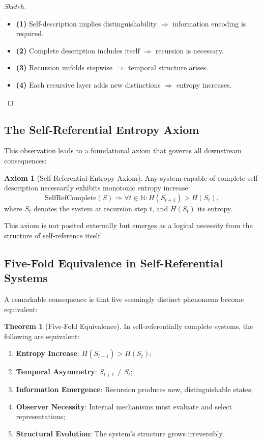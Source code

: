 \documentclass[11pt]{article}
\theoremstyle{remark}
\theoremstyle{definition}
\newtheorem{theorem}{Theorem}
\newtheorem{axiom}{Axiom}
\begin{document}
\begin{proof}[Sketch]
\begin{itemize}
\item \textbf{(1)} Self-description implies distinguishability $\Rightarrow$ information encoding is required.
\item \textbf{(2)} Complete description includes itself $\Rightarrow$ recursion is necessary.
\item \textbf{(3)} Recursion unfolds stepwise $\Rightarrow$ temporal structure arises.
\item \textbf{(4)} Each recursive layer adds new distinctions $\Rightarrow$ entropy increases.
\end{itemize}
\end{proof}

\subsection{The Self-Referential Entropy Axiom}

This observation leads to a foundational axiom that governs all downstream consequences:

\begin{axiom}[Self-Referential Entropy Axiom]
Any system capable of complete self-description necessarily exhibits monotonic entropy increase:
\[
\text{SelfRefComplete}(S) \Rightarrow \forall t \in \mathbb{N}: H(S_{t+1}) > H(S_t),
\]
where $S_t$ denotes the system at recursion step $t$, and $H(S_t)$ its entropy.
\end{axiom}

This axiom is not posited externally but emerges as a logical necessity from the structure of self-reference itself.

\subsection{Five-Fold Equivalence in Self-Referential Systems}

A remarkable consequence is that five seemingly distinct phenomena become equivalent:

\begin{theorem}[Five-Fold Equivalence]
In self-referentially complete systems, the following are equivalent:
\begin{enumerate}
\item \textbf{Entropy Increase}: $H(S_{t+1}) > H(S_t)$;
\item \textbf{Temporal Asymmetry}: $S_{t+1} \neq S_t$;
\item \textbf{Information Emergence}: Recursion produces new, distinguishable states;
\item \textbf{Observer Necessity}: Internal mechanisms must evaluate and select representations;
\item \textbf{Structural Evolution}: The system’s structure grows irreversibly.
\end{enumerate}
\end{theorem}
\end{document}
